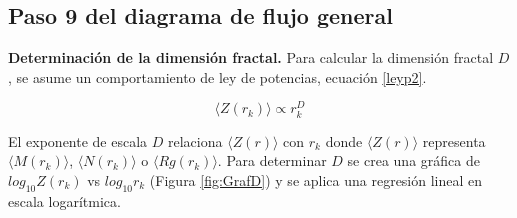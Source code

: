 		

 	
 	\subsection{Paso 9 del diagrama de flujo general}
 		

 	\textbf{Determinación de la dimensión fractal.}	 
 	Para calcular la dimensi\'{o}n fractal $D$, 
 	se asume un comportamiento de ley de potencias, ecuación \ref{leyp2}.
 	
 	\begin{equation}
 		\langle Z(r_{k}) \rangle \propto r^{D}_{k}
 		\label{leyp2}
 	\end{equation}
 	
 	El exponente de escala $D$ relaciona $\langle Z(r) \rangle$ 
 	con $r_{k}$ donde $\langle Z(r) \rangle$ representa $\langle M(r_k) \rangle$, $\langle N(r_k) \rangle$ o $\langle Rg(r_k) \rangle$. 
 	Para determinar $D$ se crea una gráfica de $log_{10}Z(r_k)$ 
 	vs $log_{10}r_{k}$ (Figura \ref{fig:GrafD}) y se aplica una 
 	regresión lineal en escala logarítmica.
 	
